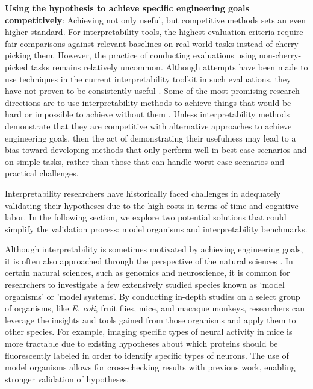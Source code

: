 \textbf{Using the hypothesis to achieve specific engineering goals competitively}: Achieving not only useful, but competitive methods sets an even higher standard. For interpretability tools, the highest evaluation criteria require fair comparisons against relevant baselines on real-world tasks instead of cherry-picking them. However, the practice of conducting evaluations using non-cherry-picked tasks remains relatively uncommon. Although attempts have been made to use techniques in the current interpretability toolkit in such evaluations, they have not proven to be consistently useful \citep{adebayo2020debuggingtestsmodelexplanations,denain2023auditingvisualizationstransparencymethods,Caspar_2023_RedTeamingDNNFeatureSynthesis,hase2023doeslocalizationinformediting, durmus2024steering}. Some of the most promising research directions are to use interpretability methods to achieve things that would be hard or impossible to achieve without them \citep{schut2023bridginghumanaiknowledgegap}. Unless interpretability methods demonstrate that they are competitive with alternative approaches to achieve engineering goals, then the act of demonstrating their usefulness may lead to a bias toward developing methods that only perform well in best-case scenarios and on simple tasks, rather than those that can handle worst-case scenarios and practical challenges.

Interpretability researchers have historically faced challenges in adequately validating their hypotheses due to the high costs in terms of time and cognitive labor. In the following section, we explore two potential solutions that could simplify the validation process: model organisms and interpretability benchmarks.

\label{par:model-organisms}

Although interpretability is sometimes motivated by achieving engineering goals, it is often also approached through the perspective of the natural sciences \citep{olah2020zoom}. In certain natural sciences, such as genomics and neuroscience, it is common for researchers to investigate a few extensively studied species known as `model organisms' or 'model systems'. By conducting in-depth studies on a select group of organisms, like \textit{E. coli}, fruit flies, mice, and macaque monkeys, researchers can leverage the insights and tools gained from those organisms and apply them to other species. For example, imaging specific types of neural activity in mice is more tractable due to existing hypotheses about which proteins should be fluorescently labeled in order to identify specific types of neurons. The use of model organisms allows for cross-checking results with previous work, enabling stronger validation of hypotheses.

